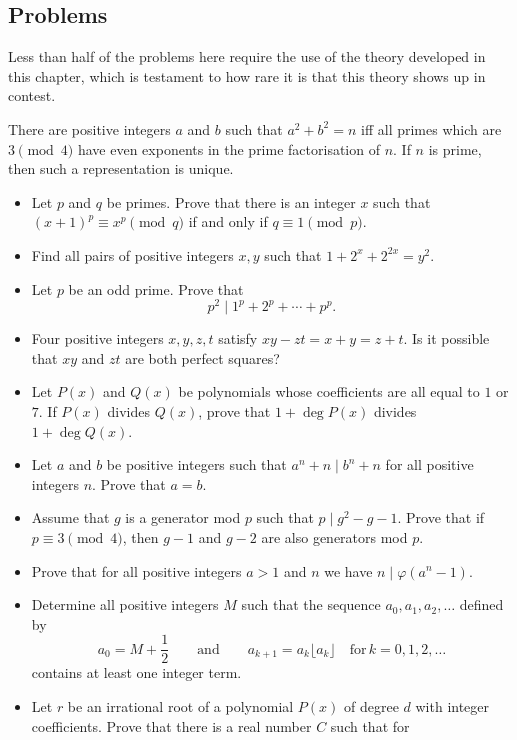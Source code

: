 \subsection{Problems}
Less than half of the problems here require the use of the theory developed in
this chapter, which is testament to how rare it is that this theory shows up in
contest.
\begin{result}{\label{r:a:n:pr:1}}
    There are positive integers $a$ and $b$ such that $a^2+b^2=n$ iff all primes
    which are $3\pmod 4$ have even exponents in the prime factorisation of $n$.
    If $n$ is prime, then such a representation is unique.
\end{result}
\begin{itemize}
  \item Let $p$ and $q$ be primes. Prove that there is an integer $x$ such that
    $(x+1)^p\equiv x^p\pmod q$ if and only if $q\equiv 1\pmod p$.
  \item Find all pairs of positive integers $x,y$ such that
    $1+2^x+2^{2x}=y^2$.
  \item Let $p$ be an odd prime. Prove that
    \[p^2\mid 1^p+2^p+\cdots+p^p.\]
  \item Four positive integers $x,y,z,t$ satisfy $xy-zt=x+y=z+t$. Is it possible
    that $xy$ and $zt$ are both perfect squares?
  \item Let $P(x)$ and $Q(x)$ be polynomials whose coefficients are all equal to
    $1$ or $7$. If $P(x)$ divides $Q(x)$, prove that $1+\deg P(x)$ divides
    $1+\deg Q(x)$.
  \item Let $a$ and $b$ be positive integers such that $a^n+n\mid b^n+n$ for all
    positive integers $n$. Prove that $a=b$.
  \item Assume that $g$ is a generator mod $p$ such that $p\mid g^2-g-1$. Prove
      that if $p\equiv 3\pmod 4$, then $g-1$ and $g-2$ are also generators mod
      $p$.
  \item Prove that for all positive integers $a>1$ and $n$ we have
    $n\mid\varphi(a^n-1)$.
\item Determine all positive integers $M$ such that the sequence $a_0, a_1,
      a_2, \ldots$ defined by \[ a_0 = M + \frac{1}{2} \qquad \textrm{and}
        \qquad a_{k+1} = a_k\lfloor a_k \rfloor \quad \textrm{for} \, k = 0, 1,
      2, \ldots \]contains at least one integer term.
  \item Let $r$ be an irrational root of a polynomial $P(x)$ of degree $d$ with
    integer coefficients. Prove that there is a real number $C$ such that for

\end{itemize}
